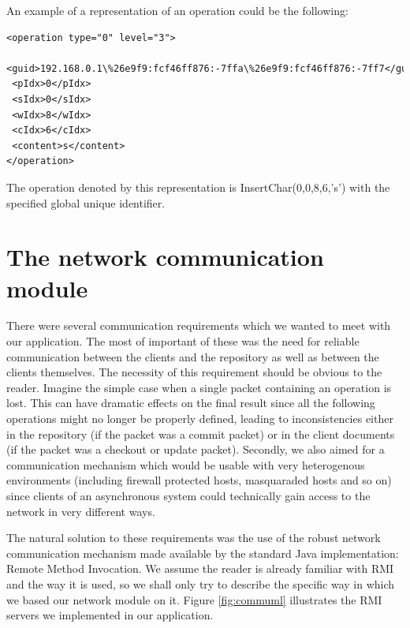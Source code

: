 An example of a representation of an operation could be the following:

\begin{verbatim}
<operation type="0" level="3">
 <guid>192.168.0.1\%26e9f9:fcf46ff876:-7ffa\%26e9f9:fcf46ff876:-7ff7</guid>
 <pIdx>0</pIdx>
 <sIdx>0</sIdx>
 <wIdx>8</wIdx>
 <cIdx>6</cIdx>
 <content>s</content>
</operation>
\end{verbatim}

The operation denoted by this representation is InsertChar(0,0,8,6,'s') with the specified
global unique identifier.

\section{The network communication module}

There were several communication requirements which we wanted to meet with our application.
The most of important of these was the need for reliable communication between the clients
and the repository as well as between the clients themselves. The necessity of this 
requirement should be obvious to the reader. Imagine the simple case when a single packet
containing an operation is lost. This can have dramatic effects on the final result since
all the following operations might no longer be properly defined, leading to inconsistencies
either in the repository (if the packet was a commit packet) or in the client documents
(if the packet was a checkout or update packet). Secondly, we also aimed for a communication
mechanism which would be usable with very heterogenous environments (including firewall
protected hosts, masquaraded hosts and so on) since clients of an asynchronous system
could technically gain access to the network in very different ways.

The natural solution to these requirements was the use of the robust network communication
mechanism made available by the standard Java implementation: Remote Method Invocation. We
assume the reader is already familiar with RMI and the way it is used, so we shall only
try to describe the specific way in which we based our network module on it. Figure
\ref{fig:commuml} illustrates the RMI servers we implemented in our application.

